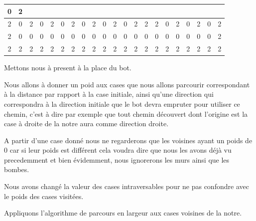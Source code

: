 \begin{center}
\begin{tabular}{|c|c|c|c|c|c|c|c|c|c|c|c|c|c|c|c|c|c|c|c|c|}
				0 & \cellcolor{cyan}2 \\\hline \cellcolor{cyan}2 & 0 & \cellcolor{cyan}2 & 0 & \cellcolor{cyan}2 & 0 & \cellcolor{cyan}2 & 0 & \cellcolor{cyan}2 & 0 & \cellcolor{cyan}2 & 0 & \cellcolor{cyan}2 & \cellcolor{cyan}2 & \cellcolor{cyan}2 & 0 & \cellcolor{cyan}2 & 0 & \cellcolor{cyan}2 & 0 & \cellcolor{cyan}2 \\\hline \cellcolor{cyan}2 & 0 & 0 & 0 & 0 & 0 & 0 & 0 & 0 & 0 & 0 & 0 & 0 & 0 & 0 & 0 & 0 & 0 & 0 & 0 & \cellcolor{cyan}2 \\\hline
				\rowcolor{cyan}2 & 2 & 2 & 2 & 2 & 2 & 2 & 2 & 2 & 2 & 2 & 2 & 2 & 2 & 2 & 2 & 2 & 2 & 2 & 2 & 2 \\\hline
				\end{tabular}
			\end{center}
			
			
			Mettons nous à present à la place du bot.
			
			Nous allons à donner un poid aux cases que nous allons parcourir
			correspondant à la distance par rapport à la case initiale, ainsi qu'une
			direction qui correspondra à la direction initiale que le bot devra empruter
			pour utiliser ce chemin, c'est à dire par exemple que tout chemin découvert
			dont l'origine est la case à droite de la notre aura comme direction droite.
			
			
			A partir d'une case donné nous ne regarderons que les voisines ayant un poids de 0
			car si leur poids est différent cela voudra dire que nous les avons déjà vu precedemment et bien évidemment,
			nous ignorerons les murs ainsi que les bombes.
			
			Nous avons changé la valeur des cases intraversables pour ne pas confondre avec le poids des cases visitées.			
			
			
			Appliquons l'algorithme de parcours en largeur aux cases voisines de la notre.
			
